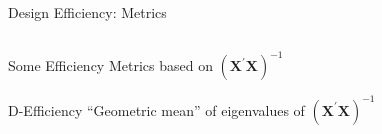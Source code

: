 \documentclass[10pt, compress, aspectratio=169, xcolor={table,usenames,dvipsnames}]{beamer}
\begin{document}
\begin{frame}[label={sec:org10953aa}]{Design Efficiency: Metrics}
\begin{columns}
\begin{column}{0.5\columnwidth}
\begin{block}{Some Efficiency Metrics based on \(\left(\bm{X}^{\prime}\bm{X}\right)^{-1}\)}
\begin{block}{D-Efficiency}
\vspace{-.3cm}
\colorbox{Accent!25}{``Geometric mean'' of eigenvalues of \(\left(\bm{X}^{\prime}\bm{X}\right)^{-1}\)}
\end{block}
\end{block}
\end{column}
\end{columns}
\end{frame}
\end{document}
